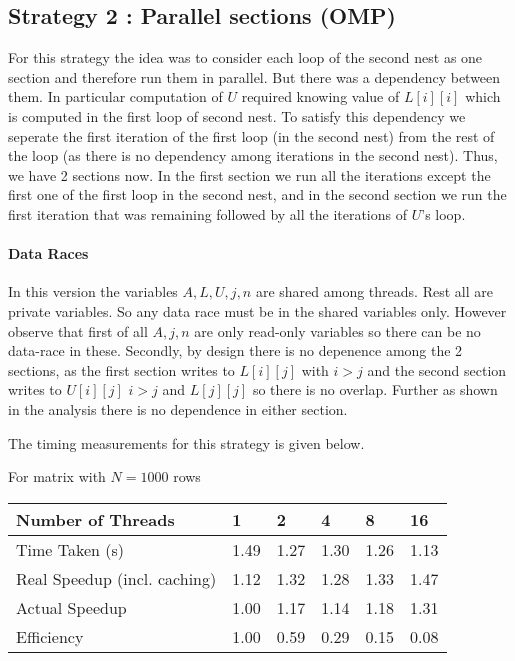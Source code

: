 \documentclass{article}
\begin{document}
\subsection{Strategy 2 : Parallel sections (OMP)}
For this strategy the idea was to consider each loop of the second nest as one section and therefore run them in parallel. But there was a dependency between them. In particular computation of $U$ required knowing value of $L[i][i]$ which is computed in the first loop of second nest. To satisfy this dependency we seperate the first iteration of the first loop (in the second nest) from the rest of the loop (as there is no dependency among iterations in the second nest). Thus, we have 2 sections now. In the first section we run all the iterations except the first one of the first loop in the second nest, and in the second section we run the first iteration that was remaining followed by all the iterations of $U$'s loop.

\paragraph{Data Races} In this version the variables $A, L, U, j, n$ are shared among threads. Rest all are private variables. So any data race must be in the shared variables only. However observe that first of all $A, j, n$ are only read-only variables so there can be no data-race in these. Secondly, by design there is no depenence among the 2 sections, as the first section writes to $L[i][j]$ with $i > j$ and the second section writes to $U[i][j]$ $i > j$ and $L[j][j]$ so there is no overlap. Further as shown in the analysis there is no dependence in either section.

The timing measurements for this strategy is given below.

For matrix with $N=1000$ rows

\begin{table}[H]
\centering
\begin{tabular}{l|lllll}
Number of Threads            & 1    & 2    & 4    & 8    & 16   \\ \hline
Time Taken (s)               & 1.49 & 1.27 & 1.30 & 1.26 & 1.13 \\
Real Speedup (incl. caching) & 1.12 & 1.32 & 1.28 & 1.33 & 1.47 \\
Actual Speedup               & 1.00 & 1.17 & 1.14 & 1.18 & 1.31 \\
Efficiency                   & 1.00 & 0.59 & 0.29 & 0.15 & 0.08
\end{tabular}
\end{table}
\end{document}
